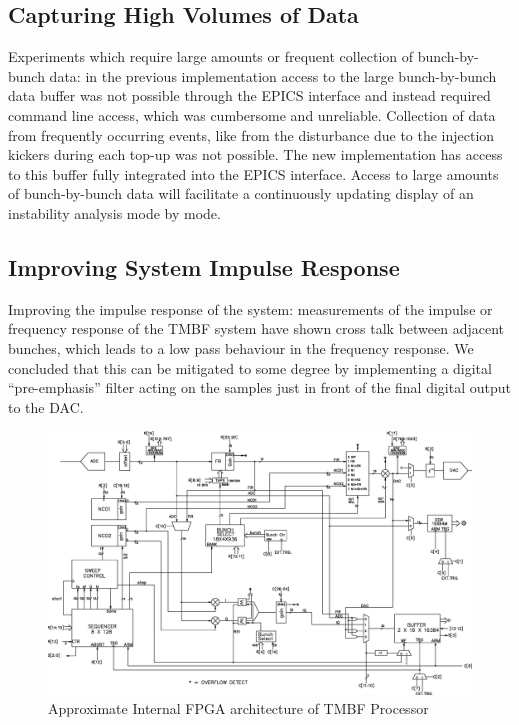 \documentclass{JAC2003}
\begin{document}
\subsection{Capturing High Volumes of Data}

Experiments which require large amounts or frequent collection of
bunch-by-bunch data: in the previous implementation access to the large
bunch-by-bunch data buffer  was not possible through the EPICS interface and
instead required command line access, which was cumbersome and unreliable.
Collection of data from frequently occurring events, like from the disturbance
due to the injection kickers during each top-up was not possible.  The new
implementation has access to this buffer fully integrated into the EPICS
interface.  Access to large amounts of bunch-by-bunch data will facilitate a
continuously updating display of an instability analysis mode by mode.


\subsection{Improving System Impulse Response}

Improving the impulse response of the system: measurements of the impulse or
frequency response of the TMBF system have shown cross talk between adjacent
bunches, which leads to a low pass behaviour in the frequency response.  We
concluded that this can be mitigated to some degree by implementing a digital
``pre-emphasis'' filter acting on the samples just in front of the final digital
output to the DAC.


\begin{figure}[!ht]
\includegraphics[width=\linewidth]{WEPC10f1}
\caption{Approximate Internal FPGA architecture of TMBF Processor}
\label{fpga:architecture}
\end{figure}
\end{document}
